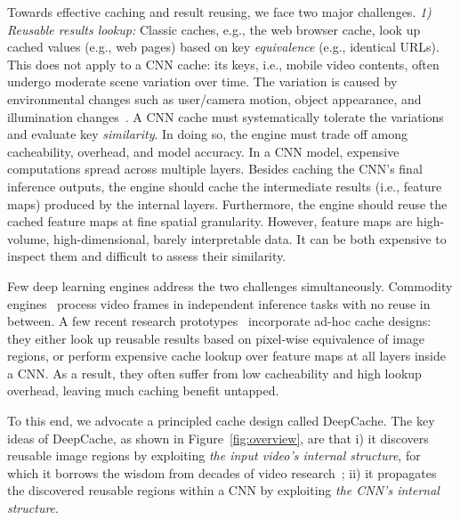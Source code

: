 \documentclass[10pt,acmtog]{acmart}
\newcommand{\framework}{DeepCache\xspace}
\newcommand{\sys}{\framework{}}
\begin{document}
Towards effective caching and result reusing, we face two major challenges.
\textit{1) Reusable results lookup:}%
Classic caches, e.g., the web browser cache, look up cached values (e.g., web pages) based on key \textit{equivalence} (e.g., identical URLs).
This does not apply to a CNN cache: 
its keys, i.e., mobile video contents, often undergo moderate scene variation over time.
The variation is caused by environmental changes such as user/camera motion, object appearance, and illumination changes~\cite{UCF101}.
A CNN cache must systematically tolerate the variations and evaluate key \textit{similarity}. 
In doing so, the engine must trade off among cacheability, overhead, and model accuracy. 
In a CNN model, expensive computations spread across multiple layers.
Besides caching the CNN's final inference outputs, 
the engine should cache the intermediate results (i.e., feature maps) produced by the internal layers. 
Furthermore, the engine should reuse the cached feature maps at fine spatial granularity. %
However, feature maps are high-volume, high-dimensional, barely interpretable data. 
It can be both expensive to inspect them and difficult to assess their similarity.

Few deep learning engines address the two challenges simultaneously.
Commodity engines~\cite{TensorFlow,caffe2,ncnn} process video frames in independent inference tasks with no reuse in between. 
A few recent research prototypes~\cite{conf/mobisys/LocLB17,cavigelli2017cbinfer} incorporate ad-hoc cache designs:
they either look up reusable results based on pixel-wise equivalence of image regions, or perform expensive cache lookup over feature maps at all layers inside a CNN. %
As a result, they often suffer from low cacheability and high lookup overhead, leaving much caching benefit untapped.

To this end, we advocate a principled cache design called \framework. 
The key ideas of \sys{}, as shown in Figure~\ref{fig:overview}, are that i) it discovers reusable image regions by exploiting \textit{the input video's internal structure}, for which it borrows the wisdom from decades of video research~\cite{tham1998novel,zhu1997new,barjatya2004block}; 
ii) it propagates the discovered reusable regions within a CNN by exploiting \textit{the CNN's internal structure}.
\end{document}

